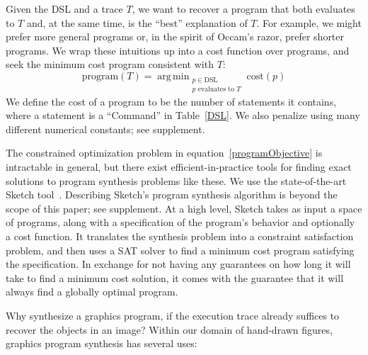 \documentclass{article}
\DeclareMathOperator*{\argmin}{arg\,min} %
\DeclareMathOperator{\argmin}{argmin} %
\newcommand{\remark}[1]{\textcolor{red}{[#1]}}
\begin{document}
Given the DSL and a trace $T$, we want to recover a program that both evaluates to $T$
and, at the same time, is the ``best'' explanation of $T$.
For example, we might prefer more general programs or, in the spirit of Occam's razor,
prefer shorter programs.
We wrap these intuitions up into a cost function over programs,
and seek the minimum cost program consistent with $T$:
\begin{equation}
  \text{program}(T) = \argmin_{\substack{p\in \text{DSL}\\p \text{ evaluates to } T}} \text{cost}(p)\label{programObjective}
\end{equation}
We define the
cost of a program to be the number of statements it contains, where a
statement is a ``Command'' in Table~\ref{DSL}.
We also penalize using many different numerical constants; see supplement.

The constrained optimization problem in
equation~\ref{programObjective} is intractable in general, but there
exist efficient-in-practice tools for finding exact solutions to
program synthesis problems like these. We use the state-of-the-art Sketch
tool~\cite{solar2008program}. Describing Sketch's program synthesis
algorithm is beyond the scope of this paper; see supplement.  At a
high level, Sketch takes as input a space of programs, along with a
specification of the program's behavior and optionally a cost
function.  It translates the synthesis problem into a constraint
satisfaction problem, and then uses a SAT solver to find a
minimum cost program satisfying the specification.  In exchange for
not having any guarantees on how long it will take to find a minimum
cost solution, it comes with the guarantee that it will always find a
globally optimal program.

Why synthesize a graphics program,
if the execution trace already suffices to recover the objects in an image?
Within our domain of hand-drawn figures, graphics program synthesis has several uses:
\end{document}
